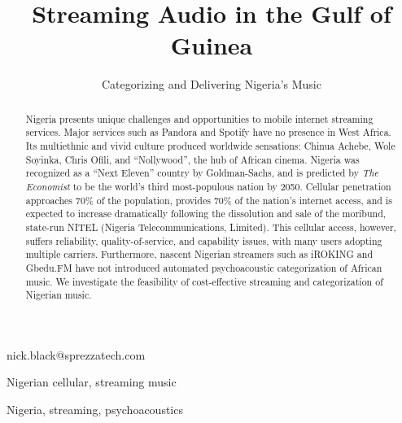 \documentclass[]{sigplanconf}
\begin{document}

\title{Streaming Audio in the Gulf of Guinea}
\subtitle{Categorizing and Delivering Nigeria's Music}

           {nick.black@sprezzatech.com}

\maketitle

\begin{abstract}
Nigeria presents unique challenges and opportunities to mobile internet streaming
services. Major services such as Pandora\cite{pandoracountries} and
Spotify\cite{spotifycountries} have no presence in West Africa. Its multiethnic
and vivid culture produced worldwide sensations: Chinua Achebe, Wole Soyinka,
Chris Ofili, and ``Nollywood'', the hub of African cinema. Nigeria
was recognized as a ``Next Eleven'' country by Goldman-Sachs\cite{n11},
and is predicted by \textit{The Economist} to be the world's third most-populous
nation by 2050\cite{economist}. Cellular penetration approaches 70\% of the population\cite{nigeriamobile},
provides 70\% of the nation's internet access, and is expected to increase
dramatically following the dissolution and sale of the moribund, state-run
NITEL (Nigeria Telecommunications, Limited)\cite{reutersnitel}. This cellular access,
however, suffers reliability, quality-of-service, and capability issues, with
many users adopting multiple carriers\cite{reuterssims}. Furthermore, nascent
Nigerian streamers such as iROKING and Gbedu.FM have not introduced 
automated psychoacoustic categorization of African music. We investigate the
feasibility of cost-effective streaming and categorization of Nigerian music.
\end{abstract}


\terms
Nigerian cellular, streaming music

\keywords
Nigeria, streaming, psychoacoustics
\end{document}
